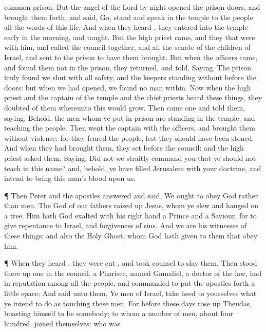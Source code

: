 {common
prison.
But the
angel of the
Lord
by
night
opened the
prison
doors,
and
brought
them
forth, and
said,
Go,
stand
and
speak
in the
temple to the
people
all the
words
of
this
life.
And when they
heard
{}, they
entered
into the
temple early in the
morning,
and
taught.
But the high
priest
came,
and they that
were
with
him,
and
called the
council
together,
and
all the
senate of the
children of
Israel,
and
sent
to the
prison to
have
them
brought.
But
when the
officers
came,
and
found
them
not
in the
prison, they
returned,
and
told,
Saying, The
prison
truly found
we
shut
with
all
safety,
and the
keepers
standing
without
before the
doors:
but when we had
opened, we
found no
man
within.
Now
when the high
priest
and the
captain of the
temple
and the chief
priests
heard
these
things, they
doubted
of
them
whereunto
this would
grow.
Then
came
one
and
told
them,
saying,
Behold, the
men
whom ye
put
in
prison
are
standing
in the
temple,
and
teaching the
people.
Then
went the
captain
with the
officers,
and
brought
them
without
violence:
for they
feared the
people,
lest they should have been
stoned.
And when they had
brought
them, they
set
{}
before the
council:
and the high
priest
asked
them,
Saying, Did
not
we
straitly
command
you that ye
should
not
teach
in
this
name?
and,
behold, ye have
filled
Jerusalem
with
your
doctrine,
and
intend to
bring
this
man’s
blood
upon
us.
\par }{\PP {}¶
Then
Peter
and
the
{}
apostles
answered
and
said,
We
ought to
obey
God
rather
than
men.
The
God
of
our
fathers raised
up
Jesus,
whom
ye
slew and
hanged
on a
tree.
Him
hath
God
exalted
with
his right
hand
{} a
Prince
and a
Saviour, for to
give
repentance to
Israel,
and
forgiveness of
sins.
And
we
are
his
witnesses
of
these
things;
and
{}
also
the
Holy
Ghost,
whom
God hath
given to
them
that
obey
him.
\par }{\PP {}¶
When they
heard
{}, they were
cut
{},
and took
counsel to
slay
them.
Then stood there
up
one
in the
council, a
Pharisee,
named
Gamaliel, a doctor of the
law, had in
reputation
among
all the
people, and
commanded to
put the
apostles
forth a little
space;
And
said
unto
them, Ye
men of
Israel, take
heed to
yourselves
what ye
intend to
do as
touching
these
men.
For
before
these
days rose
up
Theudas,
boasting
himself to
be
somebody; to
whom a
number of
men,
about four
hundred, joined
themselves:
who was
}
